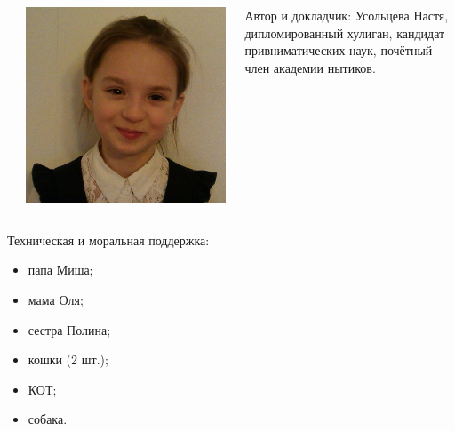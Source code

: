 \begin{frame}
\begin{columns}
{{\begin{center}
                    \end{center}
                }
            }
             {
                \begin{center}
                    \includegraphics[width=.8\textwidth]{fig/nastyaOfficial}
                \end{center}
            }
        
            \alert{Автор и докладчик}: Усольцева Настя, дипломированный хулиган, кандидат привниматических наук, почётный член академии нытиков.
    \end{columns}    
    
    \par\bigskip
    
    \alert{Техническая и моральная поддержка}:
    \begin{itemize}
        \item папа Миша;
        \item мама Оля;
        \item сестра Полина;
        \item кошки (2 шт.);
        \item \alert{КОТ};
        \item собака.
    \end{itemize}
\end{frame}

